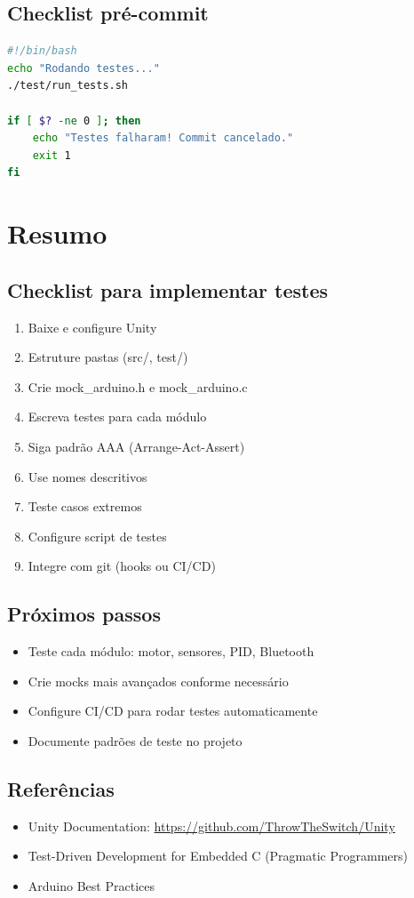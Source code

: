 \documentclass[12pt,a4paper]{article}
\begin{document}
\subsection{Checklist pré-commit}

\begin{lstlisting}[language=bash, caption=.git/hooks/pre-commit]
#!/bin/bash
echo "Rodando testes..."
./test/run_tests.sh

if [ $? -ne 0 ]; then
    echo "Testes falharam! Commit cancelado."
    exit 1
fi
\end{lstlisting}

\section{Resumo}

\subsection{Checklist para implementar testes}

\begin{enumerate}
    \item[\checkmark] Baixe e configure Unity
    \item[\checkmark] Estruture pastas (src/, test/)
    \item[\checkmark] Crie mock\_arduino.h e mock\_arduino.c
    \item[\checkmark] Escreva testes para cada módulo
    \item[\checkmark] Siga padrão AAA (Arrange-Act-Assert)
    \item[\checkmark] Use nomes descritivos
    \item[\checkmark] Teste casos extremos
    \item[\checkmark] Configure script de testes
    \item[\checkmark] Integre com git (hooks ou CI/CD)
\end{enumerate}

\subsection{Próximos passos}

\begin{itemize}
    \item Teste cada módulo: motor, sensores, PID, Bluetooth
    \item Crie mocks mais avançados conforme necessário
    \item Configure CI/CD para rodar testes automaticamente
    \item Documente padrões de teste no projeto
\end{itemize}

\subsection{Referências}

\begin{itemize}
    \item Unity Documentation: \url{https://github.com/ThrowTheSwitch/Unity}
    \item Test-Driven Development for Embedded C (Pragmatic Programmers)
    \item Arduino Best Practices
\end{itemize}
\end{document}
